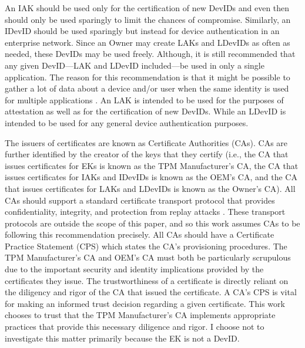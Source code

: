 \documentclass[runningheads]{llncs}
\begin{document}
An IAK should be used only for the certification of new DevIDs and even then should only be used sparingly to limit the chances of compromise. Similarly, an IDevID should be used sparingly but instead for device authentication in an enterprise network. Since an Owner may create LAKs and LDevIDs as often as needed, these DevIDs may be used freely. Although, it is still recommended that any given DevID---LAK and LDevID included---be used in only a single application. The reason for this recommendation is that it might be possible to gather a lot of data about a device and/or user when the same identity is used for multiple applications \cite{KeyManagement}. An LAK is intended to be used for the purposes of attestation as well as for the certification of new DevIDs. While an LDevID is intended to be used for any general device authentication purposes.

The issuers of  certificates are known as Certificate Authorities (CAs). CAs are further identified by the creator of the keys that they certify (i.e., the CA that issues certificates for EKs is known as the TPM Manufacturer's CA, the CA that issues certificates for IAKs and IDevIDs is known as the OEM's CA, and the CA that issues certificates for LAKs and LDevIDs is known as the Owner's CA). All CAs should support a standard certificate transport protocol that provides confidentiality, integrity, and protection from replay attacks \cite{DevIDSpec-TCG}. These transport protocols are outside the scope of this paper, and so this work assumes CAs to be following this recommendation precisely. All CAs should have a Certificate Practice Statement (CPS) which states the CA's provisioning procedures.  The TPM Manufacturer's CA and OEM's CA must both be particularly scrupulous due to the important security and identity implications provided by the certificates they issue. The trustworthiness of a certificate is directly reliant on the diligency and rigor of the CA that issued the certificate. A CA's CPS is vital for making an informed trust decision regarding a given certificate. This work chooses to trust that the TPM Manufacturer's CA implements appropriate practices that provide this necessary diligence and rigor. I choose not to investigate this matter primarily because the EK is not a DevID.
\end{document}
